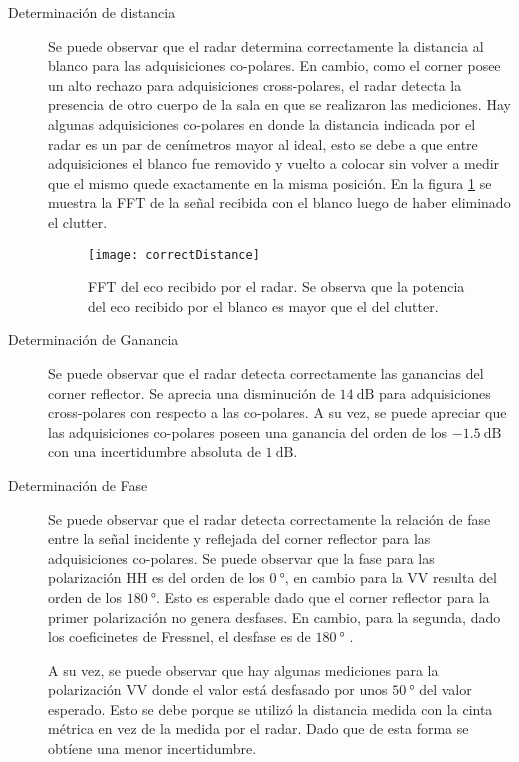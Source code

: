 \begin{description}
  \item[Determinación de distancia] Se puede observar que el radar determina correctamente la distancia al blanco para las adquisiciones co-polares. En cambio, como el corner posee un alto rechazo para adquisiciones cross-polares, el radar detecta la presencia de otro cuerpo de la sala en que se realizaron las mediciones. Hay algunas adquisiciones co-polares en donde la distancia indicada por el radar es un par de cenímetros mayor al ideal, esto se debe a que entre adquisiciones el blanco fue removido y vuelto a colocar sin volver a medir que el mismo quede exactamente en la misma posición. En la figura \ref{fig:correctDistance} se muestra la FFT de la señal recibida con el blanco luego de haber eliminado el clutter.

  \begin{figure}[htb]
    \centering
    \texttt{[image: correctDistance]}
    \caption{FFT del eco recibido por el radar. Se observa que la potencia del eco recibido por el blanco es mayor que el del clutter.}
    \label{fig:correctDistance}
  \end{figure}

  \item[Determinación de Ganancia] Se puede observar que el radar detecta correctamente las ganancias del corner reflector. Se aprecia una disminución de $\SI{14}{\dB}$ para adquisiciones cross-polares con respecto a las co-polares. A su vez, se puede apreciar que las adquisiciones co-polares poseen una ganancia del orden de los $\SI{-1.5}{\dB}$ con una incertidumbre absoluta de $\SI{1}{\dB}$.

  \item[Determinación de Fase] Se puede observar que el radar detecta correctamente la relación de fase entre la señal incidente y reflejada del corner reflector para las adquisiciones co-polares. Se puede observar que la fase para las polarización HH es del orden de los $\SI{0}{\degree}$, en cambio para la VV resulta del orden de los $\SI{180}{\degree}$. Esto es esperable dado que el corner reflector para la primer polarización no genera desfases. En cambio, para la segunda, dado los coeficinetes de Fressnel, el desfase es de $\SI{180}{\degree}$ \cite{Michelson1993}.

  A su vez, se puede observar que hay algunas mediciones para la polarización VV donde el valor está desfasado por unos $\SI{50}{\degree}$ del valor esperado. Esto se debe porque se utilizó la distancia medida con la cinta métrica en vez de la medida por el radar. Dado que de esta forma se obtíene una menor incertidumbre.
\end{description}


